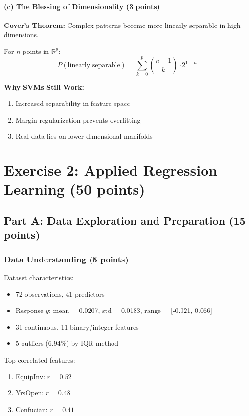 \documentclass[12pt,a4paper]{article}
\newcommand{\R}{\mathbb{R}}
\theoremstyle{definition}
\begin{document}
\paragraph{(c) The Blessing of Dimensionality (3 points)}

\textbf{Cover's Theorem:} Complex patterns become more linearly separable in high dimensions.

For $n$ points in $\R^p$:
\begin{equation}
P(\text{linearly separable}) = \sum_{k=0}^{p} \binom{n-1}{k} \cdot 2^{1-n}
\end{equation}

\textbf{Why SVMs Still Work:}
\begin{enumerate}
\item Increased separability in feature space
\item Margin regularization prevents overfitting
\item Real data lies on lower-dimensional manifolds
\end{enumerate}

\section{Exercise 2: Applied Regression Learning (50 points)}

\subsection{Part A: Data Exploration and Preparation (15 points)}

\subsubsection{Data Understanding (5 points)}

Dataset characteristics:
\begin{itemize}
\item 72 observations, 41 predictors
\item Response $y$: mean = 0.0207, std = 0.0183, range = [-0.021, 0.066]
\item 31 continuous, 11 binary/integer features
\item 5 outliers (6.94\%) by IQR method
\end{itemize}

Top correlated features:
\begin{enumerate}
\item EquipInv: $r = 0.52$
\item YrsOpen: $r = 0.48$
\item Confucian: $r = 0.41$
\end{enumerate}
\end{document}
